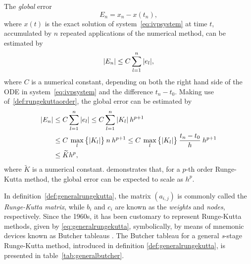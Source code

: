 The \emph{global} error
\begin{equation}
    \label{eq:rungekuttaglobalorderdef}
    E_{n} = x_{n}-x(t_{n}),
\end{equation}
where $x(t)$ is the exact solution of system~\eqref{eq:ivpsystem} at time $t$,
accumulated by $n$ repeated applications of the numerical method, can be
estimated by
\begin{equation}
    \label{eq:rungekuttaglobalorderapprox}
    \abs{E_{n}} \leq C\sum\limits_{l=1}^{n}\abs{e_{l}},
\end{equation}
where $C$ is a numerical constant, depending on both the right hand side of
the ODE in system~\eqref{eq:ivpsystem} and the difference $t_{n}-t_{0}$.
Making use of~\cref{def:rungekuttaorder}, the global error can be estimated
by
\begin{gather}
    \label{eq:rungekuttaglobalorderestimate}
    \begin{aligned}
        \abs{E_{n}}&\leq C\sum\limits_{l=1}^{n}\abs{e_{l}} %
        \leq C\sum\limits_{l=1}^{n}\abs{K_{l}}\hspace{0.5ex}h^{p+1} \\
        &\leq C\hspace{0.5ex}\max\limits_{l}\big\{\abs{K_{l}}\big\}\hspace{0.5ex}n\hspace{0.5ex}h^{p+1}%
        \leq C\hspace{0.5ex}\max\limits_{l}\big\{\abs{K_{l}}\big\}\hspace{0.5ex}\frac{t_{n}-t_{0}}{h}\hspace{0.5ex}h^{p+1}\\
        &\leq \widetilde{K}h^{p},
    \end{aligned}
\end{gather}
where $\widetilde{K}$ is a numerical constant.
 demonstrates that, for a $p$-th
order Runge-Kutta method, the global error can be expected to scale
as $h^{p}$.

%
In definition~\ref{def:generalrungekutta}, the matrix $(a_{i,j})$ is commonly
called the \emph{Runge-Kutta matrix}, while $b_{i}$ and $c_{i}$ are known as
the \emph{weights} and \emph{nodes}, respectively.  Since the 1960s, it has
been customary to represent Runge-Kutta methods, given by
\cref{eq:generalrungekutta}, symbolically, by means of mnemonic devices known
as Butcher tableaus \parencite[p.134]{hairer1993solving}. The Butcher tableau
for a general \emph{s}-stage Runge-Kutta method, introduced in definition
\ref{def:generalrungekutta}, is presented in table~\ref{tab:generalbutcher}.


